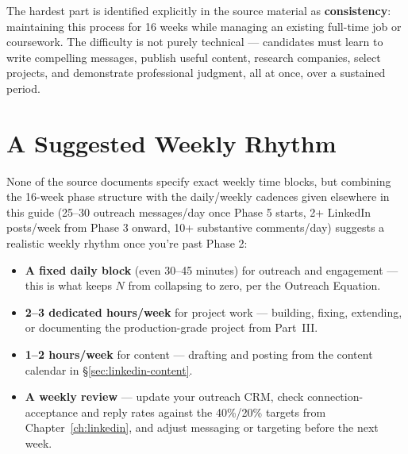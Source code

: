 \begin{keytakeaway}
The hardest part is identified explicitly in the source material as \textbf{consistency}: maintaining this
process for 16 weeks while managing an existing full-time job or coursework. The difficulty is not purely
technical --- candidates must learn to write compelling messages, publish useful content, research companies,
select projects, and demonstrate professional judgment, all at once, over a sustained period.
\end{keytakeaway}

\section{A Suggested Weekly Rhythm}

None of the source documents specify exact weekly time blocks, but combining the 16-week phase structure with the
daily/weekly cadences given elsewhere in this guide (25--30 outreach messages/day once Phase 5 starts, 2+
LinkedIn posts/week from Phase 3 onward, 10+ substantive comments/day) suggests a realistic weekly rhythm once
you're past Phase 2:

\begin{itemize}
  \item \textbf{A fixed daily block} (even 30--45 minutes) for outreach and engagement --- this is what keeps $N$
  from collapsing to zero, per the Outreach Equation.
  \item \textbf{2--3 dedicated hours/week} for project work --- building, fixing, extending, or documenting the
  production-grade project from Part~III.
  \item \textbf{1--2 hours/week} for content --- drafting and posting from the content calendar in
  \S\ref{sec:linkedin-content}.
  \item \textbf{A weekly review} --- update your outreach CRM, check connection-acceptance and reply rates against
  the 40\%/20\% targets from Chapter~\ref{ch:linkedin}, and adjust messaging or targeting before the next week.
\end{itemize}

